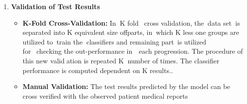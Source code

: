 \begin{abstracts}
{\begin{enumerate}
\item \textbf{Validation of Test Results}  
\begin{itemize}
		\item \textbf{K-Fold Cross-Validation:} In\tiny\textcolor{white}{n}\normalsize K fold \tiny\textcolor{white}{a}\normalsize cross validation, the\tiny\textcolor{white}{n}\normalsize data set\tiny\textcolor{white}{h}\normalsize is separated into K equivalent size of\tiny\textcolor{white}{f}\normalsize parts, in\tiny\textcolor{white}{n}\normalsize which K less one groups are utilized to\tiny\textcolor{white}{o}\normalsize train the\tiny\textcolor{white}{n}\normalsize classifiers and remaining part\tiny\textcolor{white}{y}\normalsize is utilized for\tiny\textcolor{white}{m}\normalsize checking the out-performance in\tiny\textcolor{white}{n}\normalsize \tiny\textcolor{white}{r}\normalsize each progression. The procedure of this new\tiny\textcolor{white}{s}\normalsize valid\tiny\textcolor{white}{i}\normalsize ation is repeated K\tiny\textcolor{white}{n}\normalsize number of times. The classifier performance is computed dependent on K results..
		\item \textbf{Manual Validation:} The test results predicted by the model can be cross verified with the observed patient medical reports
\end{itemize}
\end{enumerate}

}
\end{abstracts}


